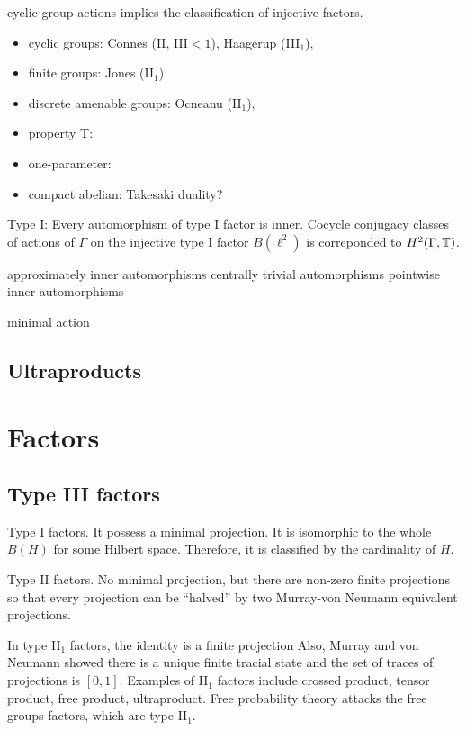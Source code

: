 \documentclass{../../large}
\begin{document}
cyclic group actions implies the classification of injective factors.

\begin{itemize}
\item cyclic groups: Connes (II, III$<1$), Haagerup (III$_1$),
\item finite groups: Jones (II$_1$)
\item discrete amenable groups: Ocneanu (II$_1$), 
\item property T:
\item one-parameter:
\item compact abelian: Takesaki duality?
\end{itemize}

Type I:
Every automorphism of type I factor is inner.
Cocycle conjugacy classes of actions of $\Gamma$ on the injective type I factor $B(\ell^2)$ is correponded to $H^2(\Gamma,\mathbb{T})$.

approximately inner automorphisms
centrally trivial automorphisms
pointwise inner automorphisms

minimal action




\chapter{Ultraproducts}
\chapter{}




\part{Factors}


\chapter{Type III factors}



Type I factors.
It possess a minimal projection.
It is isomorphic to the whole $B(H)$ for some Hilbert space.
Therefore, it is classified by the cardinality of $H$.

Type II factors.
No minimal projection, but there are non-zero finite projections so that every projection can be ``halved'' by two Murray-von Neumann equivalent projections.

In type II$_1$ factors, the identity is a finite projection
Also, Murray and von Neumann showed there is a unique finite tracial state and the set of traces of projections is $[0,1]$.
Examples of II$_1$ factors include crossed product, tensor product, free product, ultraproduct.
Free probability theory attacks the free groups factors, which are type II$_1$.
\end{document}

